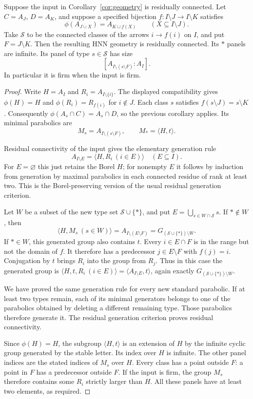 \begin{corollary}\label{cor:rc}
Suppose the input in Corollary~\ref{cor:geometry} is residually connected.
Let $C=A_J$, $D=A_K$, and suppose a specified bijection
$f:I\setminus J\longrightarrow I\setminus K$ satisfies
\[
 \phi(A_{J\cup X})=A_{K\cup f(X)}\qquad(X\subseteq I\setminus J).
\]
Take $\mathcal S$ to be the connected classes of the arrows $i\to f(i)$
on $I$, and put $F=J\setminus K$. Then the resulting HNN geometry is
residually connected. Its $*$ panels are infinite. Its panel of type
$s\in\mathcal S$ has size
\[
 [A_{I\setminus(s\setminus F)}:A_I].
\]
In particular it is firm when the input is firm.
\end{corollary}
\begin{proof}
Write $H=A_I$ and $R_i=A_{I\setminus\{i\}}$.
The displayed compatibility gives $\phi(H)=H$ and
$\phi(R_i)=R_{f(i)}$ for $i\notin J$.
Each class $s$ satisfies $f(s\setminus J)=s\setminus K$.
Consequently $\phi(A_s\cap C)=A_s\cap D$, so the previous corollary
applies. Its minimal parabolics are
\[
 M_s=A_{I\setminus(s\setminus F)},\qquad M_*=\langle H,t\rangle.
\]

Residual connectivity of the input gives the elementary generation rule
\[
 A_{I\setminus E}=\langle H,R_i\ (i\in E)\rangle
 \quad(E\subseteq I).
\]
For $E=\varnothing$ this just retains the Borel $H$; for nonempty $E$
it follows by induction from generation by maximal parabolics in each
connected residue of rank at least two. This is the Borel-preserving
version of the usual residual generation criterion.

Let $W$ be a subset of the new type set $\mathcal S\cup\{*\}$, and
put $E=\bigcup_{s\in W\cap\mathcal S}s$. If $*\notin W$, then
\[
 \langle H,M_s\ (s\in W)\rangle
 =A_{I\setminus(E\setminus F)}=G_{(\mathcal S\cup\{*\})\setminus W}.
\]
If $*\in W$, this generated group also contains $t$.
Every $i\in E\cap F$ is in the range but not the domain of $f$.
It therefore has a predecessor $j\in E\setminus F$ with $f(j)=i$.
Conjugation by $t$ brings $R_i$ into the group from $R_j$.
Thus in this case the generated group is
$\langle H,t,R_i\ (i\in E)\rangle=\langle A_{I\setminus E},t\rangle$,
again exactly $G_{(\mathcal S\cup\{*\})\setminus W}$.

We have proved the same generation rule for every new standard parabolic.
If at least two types remain, each of its minimal generators belongs to
one of the parabolics obtained by deleting a different remaining type.
Those parabolics therefore generate it. The residual generation criterion
proves residual connectivity.

Since $\phi(H)=H$, the subgroup $\langle H,t\rangle$ is an extension
of $H$ by the infinite cyclic group generated by the stable letter.
Its index over $H$ is infinite. The other panel indices are the stated
indices of $M_s$ over $H$. Every class has a point outside $F$: a point
in $F$ has a predecessor outside $F$. If the input is firm, the group
$M_s$ therefore contains some $R_i$ strictly larger than $H$.
All these panels have at least two elements, as required.
\end{proof}

